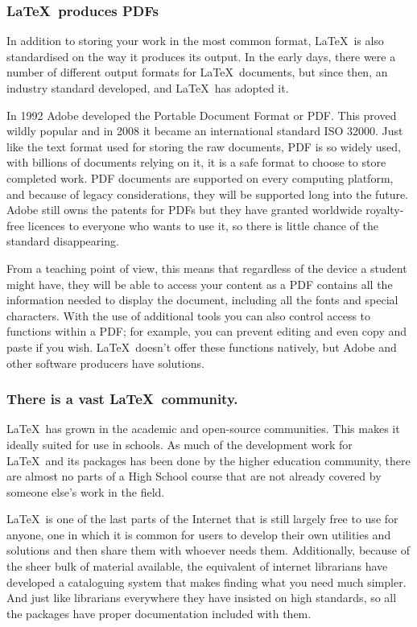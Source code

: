 \documentclass[12pt]{extarticle}
\begin{document}
\subsubsection{\LaTeX\ produces PDFs}
In addition to storing your work in the most common format, \LaTeX\ is also standardised on the way it produces its output. In the early days, there were a number of different output formats for \LaTeX\ documents, but since then, an industry standard developed, and \LaTeX\ has adopted it.

In 1992 Adobe developed the Portable Document Format or PDF. This proved wildly popular and in 2008 it became an international standard ISO 32000. Just like the text format used for storing the raw documents, PDF is so widely used, with billions of documents relying on it, it is a safe format to choose to store completed work. PDF documents are supported on every computing platform, and because of legacy considerations, they will be supported long into the future. Adobe still owns the patents for PDFs but they have granted worldwide royalty-free licences to everyone who wants to use it, so there is little chance of the standard disappearing.

From a teaching point of view, this means that regardless of the device a student might have, they will be able to access your content as a PDF contains all the information needed to display the document, including all the fonts and special characters. With the use of additional tools you can also control access to functions within a PDF; for example, you can prevent editing and even copy and paste if you wish. \LaTeX\ doesn't offer these functions natively, but Adobe and other software producers have solutions.

\subsubsection{There is a vast \LaTeX\ community.}
\LaTeX\ has grown in the academic and open-source communities. This makes it ideally suited for use in schools. As much of the development work for \LaTeX\ and its packages has been done by the higher education community, there are almost no parts of a High School course that are not already covered by someone else's work in the field.

\LaTeX\ is one of the last parts of the Internet that is still largely free to use for anyone, one in which it is common for users to develop their own utilities and solutions and then share them with whoever needs them. Additionally, because of the sheer bulk of material available, the equivalent of internet librarians have developed a cataloguing system that makes finding what you need much simpler. And just like librarians everywhere they have insisted on high standards, so all the packages have proper documentation included with them.
\end{document}

